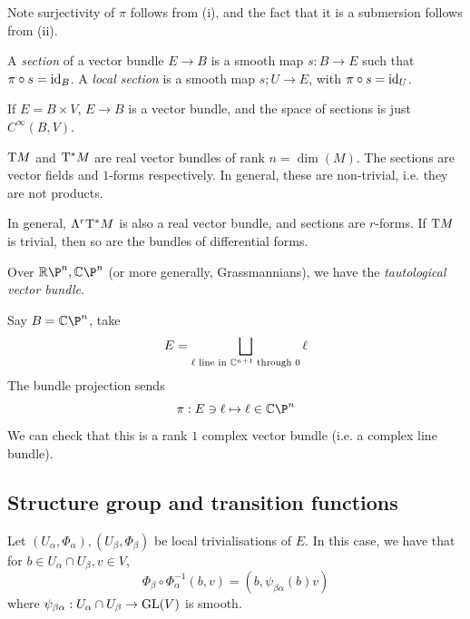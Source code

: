 \documentclass{article}
\begin{document}
\begin{remark}
    Note surjectivity of \(\pi\) follows from (i), and the fact that it is a submersion follows from (ii).
\end{remark}

\begin{definition}
     A \emph{section} of a vector bundle \(E \to B\) is a smooth map \(s : B \to E\) such that \(\pi \circ s = \operatorname{id}_B\). A \emph{local section} is a smooth map \(s ; U \to E\), with \(\pi \circ s = \operatorname{id}_U\).
\end{definition}

\begin{example}
    [product] If \(E = B \times V\), \(E \to B\) is a vector bundle, and the space of sections is just \(C^\infty(B, V)\).
\end{example}

\begin{example}
     \(\mathrm{T} M\) and \(\mathrm{T}^*M\) are real vector bundles of rank \(n = \dim(M)\). The sections are vector fields and \(1\)-forms respectively. In general, these are non-trivial, i.e. they are not products.

    In general, \(\Lambda^r\mathrm{T}^*M\) is also a real vector bundle, and sections are \(r\)-forms. If \(\mathrm{T} M\) is trivial, then so are the bundles of differential forms.
\end{example}

\begin{example}
     Over \(\R\P^n, \C\P^n\) (or more generally, Grassmannians), we have the \emph{tautological vector bundle}.

    Say \(B = \C\P^n\), take
    \[E = \bigsqcup_{\ell \text{ line in }\mathbb{C}^{n+1}\text{ through 0}}\ell\]
    The bundle projection sends
    \[\pi : E\ni \ell \mapsto \ell \in \C\P^n\]
    We can check that this is a rank \(1\) complex vector bundle (i.e. a complex line bundle).
\end{example}

\subsection{Structure group and transition functions}

Let \((U_\alpha, \Phi_\alpha), (U_\beta, \Phi_\beta)\) be local trivialisations of \(E\). In this case, we have that for \(b \in U_\alpha \cap U_\beta, v \in V\),
\[\Phi_\beta \circ \Phi_\alpha^{-1}(b, v) = (b, \psi_{\beta\alpha}(b)v)\]
where \(\psi_{\beta\alpha} : U_\alpha \cap U_\beta \to \operatorname{GL}(V)\) is smooth.
\end{document}
